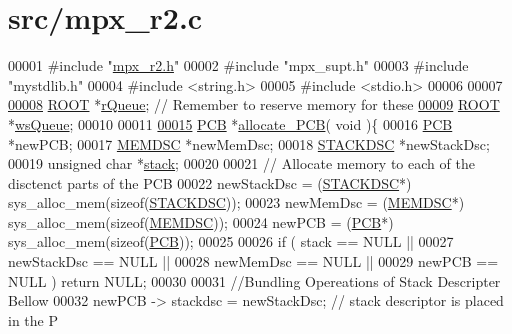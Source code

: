 \hypertarget{mpx__r2_8c_source}{
\section{src/mpx\_\-r2.c}
}

\begin{DoxyCode}
00001 \textcolor{preprocessor}{#include "\hyperlink{mpx__r2_8h}{mpx_r2.h}"}
00002 \textcolor{preprocessor}{#include "mpx\_supt.h"}
00003 \textcolor{preprocessor}{#include "mystdlib.h"}
00004 \textcolor{preprocessor}{#include <string.h>}
00005 \textcolor{preprocessor}{#include <stdio.h>}
00006 
00007 
\hypertarget{mpx__r2_8c_source_l00008}{}\hyperlink{mpx__r2_8c_afe54c168944e64a28d76b6e4d3abb391}{00008} \hyperlink{structroot}{ROOT} *\hyperlink{mpx__r2_8c_afe54c168944e64a28d76b6e4d3abb391}{rQueue}; \textcolor{comment}{// Remember to reserve memory for these}
\hypertarget{mpx__r2_8c_source_l00009}{}\hyperlink{mpx__r2_8c_ac4950750e25f86d7ee69d6bcca87ef5f}{00009} \hyperlink{structroot}{ROOT} *\hyperlink{mpx__r2_8c_ac4950750e25f86d7ee69d6bcca87ef5f}{wsQueue};
00010 
00011 
\hypertarget{mpx__r2_8c_source_l00015}{}\hyperlink{mpx__r2_8c_a58a8a1ea0a96b9ecf0be29179a5a0a1e}{00015} \hyperlink{structprocess}{PCB} *\hyperlink{mpx__r2_8c_a58a8a1ea0a96b9ecf0be29179a5a0a1e}{allocate_PCB}( \textcolor{keywordtype}{void} )\{
00016         \hyperlink{structprocess}{PCB} *newPCB; 
00017         \hyperlink{structmem}{MEMDSC} *newMemDsc;
00018         \hyperlink{structstack}{STACKDSC} *newStackDsc;
00019         \textcolor{keywordtype}{unsigned} \textcolor{keywordtype}{char} *\hyperlink{structstack}{stack}; 
00020         
00021         \textcolor{comment}{// Allocate memory to each of the disctenct parts of the PCB}
00022         newStackDsc = (\hyperlink{structstack}{STACKDSC}*) sys\_alloc\_mem(\textcolor{keyword}{sizeof}(\hyperlink{structstack}{STACKDSC}));
00023         newMemDsc = (\hyperlink{structmem}{MEMDSC}*) sys\_alloc\_mem(\textcolor{keyword}{sizeof}(\hyperlink{structmem}{MEMDSC}));
00024         newPCB = (\hyperlink{structprocess}{PCB}*) sys\_alloc\_mem(\textcolor{keyword}{sizeof}(\hyperlink{structprocess}{PCB}));
00025         
00026         \textcolor{keywordflow}{if} ( stack == NULL || 
00027                  newStackDsc == NULL || 
00028                  newMemDsc == NULL || 
00029                  newPCB == NULL ) \textcolor{keywordflow}{return} NULL;
00030         
00031         \textcolor{comment}{//Bundling Opereations of Stack Descripter Bellow}
00032         newPCB -> stackdsc = newStackDsc;  \textcolor{comment}{// stack descriptor is placed in the P
}
\end{DoxyCode}
